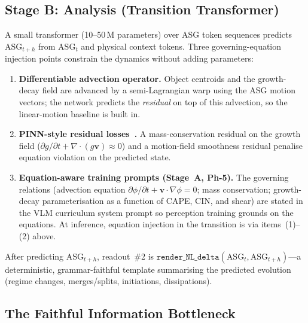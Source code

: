 \documentclass[fleqn,10pt]{wlscirep}
\begin{document}
\subsection*{Stage B: Analysis (Transition Transformer)}

A small transformer (10--50\,M parameters) over ASG token sequences predicts $\text{ASG}_{t+h}$ from $\text{ASG}_t$ and physical context tokens.
Three governing-equation injection points constrain the dynamics without adding parameters:

\begin{enumerate}[leftmargin=*,nosep]
    \item \textbf{Differentiable advection operator.} Object centroids and the growth-decay field are advanced by a semi-Lagrangian warp using the ASG motion vectors; the network predicts the \emph{residual} on top of this advection, so the linear-motion baseline is built in.
    \item \textbf{PINN-style residual losses~\cite{raissi2019pinn}.} A mass-conservation residual on the growth field ($\partial g / \partial t + \nabla \cdot (g\mathbf{v}) \approx 0$) and a motion-field smoothness residual penalise equation violation on the predicted state.
    \item \textbf{Equation-aware training prompts (Stage~A, Ph-5).} The governing relations (advection equation $\partial\phi/\partial t + \mathbf{v}\cdot\nabla\phi = 0$; mass conservation; growth-decay parameterisation as a function of CAPE, CIN, and shear) are stated in the VLM curriculum system prompt so perception training grounds on the equations. At inference, equation injection in the transition is via items~(1)--(2) above.
\end{enumerate}

\noindent After predicting $\text{ASG}_{t+h}$, readout~\#2 is $\texttt{render\_NL\_delta}(\text{ASG}_t, \text{ASG}_{t+h})$---a deterministic, grammar-faithful template summarising the predicted evolution (regime changes, merges/splits, initiations, dissipations).

\subsection*{The Faithful Information Bottleneck}
\end{document}
